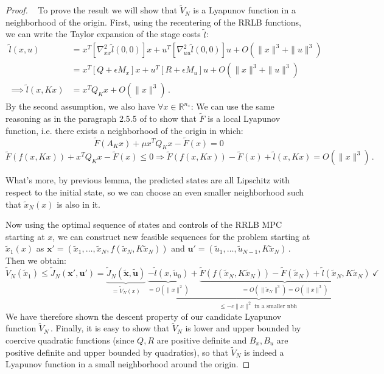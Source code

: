 \documentclass[journal]{IEEEtran}
\theoremstyle{definition}
\theoremstyle{remark}
\def\bf#1{\mathbf{#1}}
\newcommand{\R}{\mathbb{R}}
\begin{document}
\begin{proof}~
	To prove the result we will show that $\tilde{V}_N$ is a Lyapunov function in a neighborhood of the origin.
	First, using the recentering of the RRLB functions, we can write the Taylor expansion of the stage costs $\tilde{l}$:
	\begin{align*}
		\tilde{l}(x,u)&=x^T[\nabla_{xx}^2\tilde{l}(0,0)] x+u^T[\nabla_{uu}^2\tilde{l}(0,0)]u+O(\|x\|^3+\|u\|^3)\\
		&=x^T[Q+\epsilon M_x]x+u^T[R+\epsilon M_u]u+O(\|x\|^3+\|u\|^3)\\
		\implies\tilde{l}(x,Kx)&=x^TQ_Kx+O(\|x\|^3)\,.
	\end{align*}
	By the second assumption, we also have $\forall x\in\R^{n_x}$:
	We can use the same reasoning as in the paragraph 2.5.5 of \cite{MPC-book} to show that $\tilde{F}$ is a local Lyapunov function, i.e. there exists a neighborhood of the origin in which:
	$$\tilde{F}(A_Kx)+\mu x^T Q_K x-\tilde{F}(x)=0$$
	$$\tilde{F}(f(x,Kx))+x^T Q_K x-\tilde{F}(x)\leq 0\Longrightarrow\tilde{F}(f(x,Kx))-\tilde{F}(x)+\tilde{l}(x,Kx)=O(\|x\|^3)\,.$$

	\noindent What's more, by previous lemma, the predicted states are all Lipschitz with respect to the initial state, so we can choose an even smaller neighborhood such that $\tilde{x}_N(x)$ is also in it.

	\noindent Now using the optimal sequence of states and controls of the RRLB MPC starting at $x$, we can construct new feasible sequences for the problem starting at $\tilde{x}_1(x)$ as \newline
	$\bf{x}'=(\tilde{x}_1,\ldots,\tilde{x}_N,f(\tilde{x}_N,K\tilde{x}_N))$ and $\bf{u}'=(\tilde{u}_1,\ldots,\tilde{u}_{N-1},K\tilde{x}_N)$\,.
	Then we obtain:
	$$\tilde{V}_N(\tilde{x}_1)\leq\tilde{J}_N(\bf{x}',\bf{u}')=\underbrace{\tilde{J}_N(\tilde{\bf{x}},\tilde{\bf{u}})}_{=\tilde{V}_N(x)}~\underbrace{\underbrace{-\tilde{l}(x,\tilde{u}_0)}_{=O(\|x\|^2)}+\underbrace{\tilde{F}(f(\tilde{x}_N,K\tilde{x}_N))-\tilde{F}(\tilde{x}_N)+\tilde{l}(\tilde{x}_N,K\tilde{x}_N) }_{=O(\|\tilde{x}_N\|^3)=O(\|x\|^3)} }_{\leq-c\|x\|^2\text{ in a smaller nbh }}~\checkmark$$
	We have therefore shown the descent property of our candidate Lyapunov function $\tilde{V}_N$\,.
	Finally, it is easy to show that $\tilde{V}_N$ is lower and upper bounded by coercive quadratic functions (since $Q,R$ are positive definite and $B_x,B_u$ are positive definite and upper bounded by quadratics), so that $\tilde{V}_N$ is indeed a Lyapunov function in a small neighborhood around the origin.
\end{proof}
\end{document}
